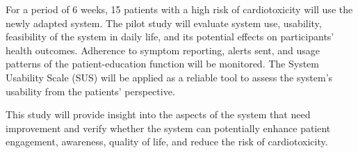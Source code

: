 \documentclass[11pt]{article}
\begin{document}
For a period of 6 weeks, 15 patients with a high risk of cardiotoxicity will use the newly adapted system. The pilot study will evaluate system use, usability, feasibility of the system in daily life, and its potential effects on participants' health outcomes. Adherence to symptom reporting, alerts sent, and usage patterns of the patient-education function will be monitored. The System Usability Scale (SUS) will be applied as a reliable tool to assess the system's usability from the patients’ perspective.

This study will provide insight into the aspects of the system that need improvement and verify whether the system can potentially enhance patient engagement, awareness, quality of life, and reduce the risk of cardiotoxicity.
\end{document}

